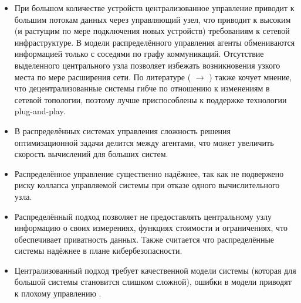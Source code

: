 \begin{itemize}

\item
При большом количестве устройств централизованное управление приводит к большим потокам данных через управляющий узел, что приводит к высоким (и растущим по мере подключения новых устройств) требованиям к сетевой инфраструктуре.
В модели распределённого управления агенты обмениваются информацией только с соседями по графу коммуникаций.
Отсутствие выделенного центрального узла позволяет избежать возникновения узкого места по мере расширения сети.
По литературе (\cite{binetti2014distributed} $\rightarrow$ \cite{elsayed2014fully}) также кочует мнение, что децентрализованные системы гибче по отношению к изменениям в сетевой топологии, поэтому лучше приспособлены к поддержке технологии plug-and-play.

\item
В распределённых системах управления сложность решения оптимизационной задачи делится между агентами, что может увеличить скорость вычислений для больших систем.

\item
Распределённое управление существенно надёжнее, так как не подвержено риску коллапса управляемой системы при отказе одного вычислительного узла.

\item
Распределённый подход позволяет не предоставлять центральному узлу информацию о своих измерениях, функциях стоимости и ограничениях, что обеспечивает приватность данных.
Также считается \cite{loia2013decentralized,molzahn2017survey} что распределённые системы надёжнее в плане кибербезопасности.

\item
Централизованный подход требует качественной модели системы (которая для большой системы становится слишком сложной), ошибки в модели приводят к плохому управлению \cite{binetti2014distributed}.


\end{itemize}


